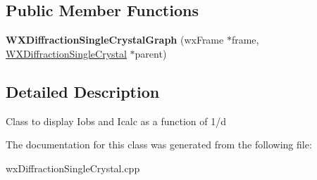 \subsection*{Public Member Functions}
\begin{DoxyCompactItemize}
\item 
\mbox{\label{class_obj_cryst_1_1_w_x_diffraction_single_crystal_graph_aa7710f2658ec9ceb502b925be8d8c057}} 
{\bfseries W\+X\+Diffraction\+Single\+Crystal\+Graph} (wx\+Frame $\ast$frame, \mbox{\hyperlink{class_obj_cryst_1_1_w_x_diffraction_single_crystal}{W\+X\+Diffraction\+Single\+Crystal}} $\ast$parent)
\end{DoxyCompactItemize}


\subsection{Detailed Description}
Class to display Iobs and Icalc as a function of 1/d 

The documentation for this class was generated from the following file\+:\begin{DoxyCompactItemize}
\item 
wx\+Diffraction\+Single\+Crystal.\+cpp\end{DoxyCompactItemize}
